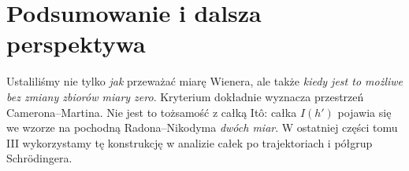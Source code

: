 \section{Podsumowanie i dalsza perspektywa}
Ustaliliśmy nie tylko \emph{jak} przeważać miarę Wienera,
ale także \emph{kiedy jest to możliwe bez zmiany zbiorów miary zero}.
Kryterium dokładnie wyznacza przestrzeń Camerona--Martina.
Nie jest to tożsamość z całką Itô: całka $I(h')$ pojawia się
we wzorze na pochodną Radona--Nikodyma \emph{dwóch miar}.
W ostatniej części tomu III wykorzystamy tę konstrukcję
w analizie całek po trajektoriach i półgrup Schrödingera.

